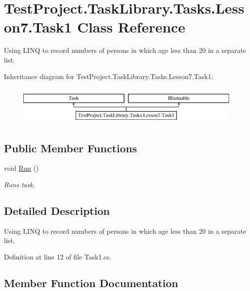 \hypertarget{class_test_project_1_1_task_library_1_1_tasks_1_1_lesson7_1_1_task1}{}\section{Test\+Project.\+Task\+Library.\+Tasks.\+Lesson7.\+Task1 Class Reference}
\label{class_test_project_1_1_task_library_1_1_tasks_1_1_lesson7_1_1_task1}


Using L\+I\+NQ to record numbers of persons in which age less than 20 in a separate list.  


Inheritance diagram for Test\+Project.\+Task\+Library.\+Tasks.\+Lesson7.\+Task1\+:\begin{figure}[H]
\begin{center}
\leavevmode
\includegraphics[height=2.000000cm]{class_test_project_1_1_task_library_1_1_tasks_1_1_lesson7_1_1_task1}
\end{center}
\end{figure}
\subsection*{Public Member Functions}
\begin{DoxyCompactItemize}
\item 
void \mbox{\hyperlink{class_test_project_1_1_task_library_1_1_tasks_1_1_lesson7_1_1_task1_ad161f62bc96cbf779ee300f0501fb41e}{Run}} ()
\begin{DoxyCompactList}\small\item\em Runs task. \end{DoxyCompactList}\end{DoxyCompactItemize}


\subsection{Detailed Description}
Using L\+I\+NQ to record numbers of persons in which age less than 20 in a separate list. 



Definition at line 12 of file Task1.\+cs.



\subsection{Member Function Documentation}
\mbox{\label{class_test_project_1_1_task_library_1_1_tasks_1_1_lesson7_1_1_task1_ad161f62bc96cbf779ee300f0501fb41e}} 
